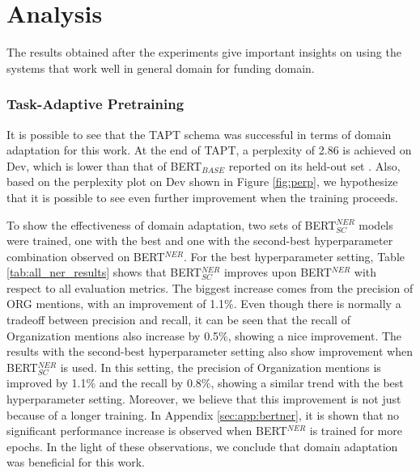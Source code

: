 \documentclass{report}
\theoremstyle{definition}
\theoremstyle{remark}
\begin{document}
\section{Analysis}
\label{sec:EvalAnalysis}

The results obtained after the experiments give important insights on using the systems that work well in general domain for funding domain. 

\subsubsection{Task-Adaptive Pretraining}

It is possible to see that the TAPT schema was successful in terms of domain adaptation for this work. At the end of TAPT, a perplexity of 2.86 is achieved on Dev, which is lower than that of BERT$_{BASE}$ reported on its held-out set \cite{BERT}. Also, based on the perplexity plot on Dev shown in Figure \ref{fig:perp}, we hypothesize that it is possible to see even further improvement when the training proceeds.

To show the effectiveness of domain adaptation, two sets of BERT$^{NER}_{SC}$ models were trained, one with the best and one with the second-best hyperparameter combination observed on BERT$^{NER}$. For the best hyperparameter setting, Table \ref{tab:all_ner_results} shows that BERT$^{NER}_{SC}$ improves upon BERT$^{NER}$ with respect to all evaluation metrics. The biggest increase comes from the precision of ORG mentions, with an improvement of 1.1\%. Even though there is normally a tradeoff between precision and recall, it can be seen that the recall of Organization mentions also increase by 0.5\%, showing a nice improvement. The results with the second-best hyperparameter setting also show improvement when BERT$^{NER}_{SC}$ is used. In this setting, the precision of Organization mentions is improved by 1.1\% and the recall by 0.8\%, showing a similar trend with the best hyperparameter setting. Moreover, we believe that this improvement is not just because of a longer training. In Appendix \ref{sec:app:bertner}, it is shown that no significant performance increase is observed when BERT$^{NER}$ is trained for more epochs. In the light of these observations, we conclude that domain adaptation was beneficial for this work. 
\end{document}
